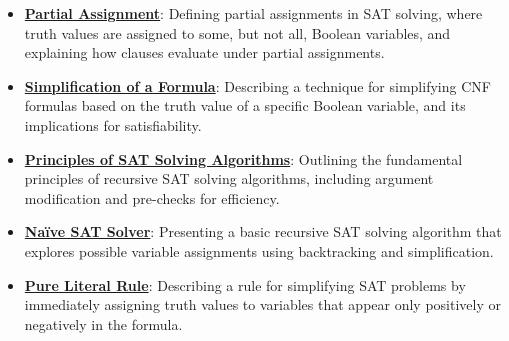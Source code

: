 \documentclass{article}%
\begin{document}
\begin{itemize}[leftmargin=*]
\item \href{https://purdue.brightspace.com/d2l/common/assets/pdfjs-d2l-dist/1.0.14-legacy/web/viewer.html?file=\%2Fcontent\%2Fenforced\%2F1095467-wl.202510.CS.24300.001\%2F15L2-SAT.pdf\%3Fou\%3D1095467\&lang=en-us\&container=d2l-fileviewer-rendered-pdf\&fullscreen=d2l-fileviewer-rendered-pdf-dialog\&height=667#page=14}{\textbf{Partial Assignment}}: Defining partial assignments in SAT solving, where truth values are assigned to some, but not all, Boolean variables, and explaining how clauses evaluate under partial assignments.%
\item \href{https://purdue.brightspace.com/d2l/common/assets/pdfjs-d2l-dist/1.0.14-legacy/web/viewer.html?file=\%2Fcontent\%2Fenforced\%2F1095467-wl.202510.CS.24300.001\%2F15L2-SAT.pdf\%3Fou\%3D1095467\&lang=en-us\&container=d2l-fileviewer-rendered-pdf\&fullscreen=d2l-fileviewer-rendered-pdf-dialog\&height=667#page=15}{\textbf{Simplification of a Formula}}: Describing a technique for simplifying CNF formulas based on the truth value of a specific Boolean variable, and its implications for satisfiability.%
\item \href{https://purdue.brightspace.com/d2l/common/assets/pdfjs-d2l-dist/1.0.14-legacy/web/viewer.html?file=\%2Fcontent\%2Fenforced\%2F1095467-wl.202510.CS.24300.001\%2F15L2-SAT.pdf\%3Fou\%3D1095467\&lang=en-us\&container=d2l-fileviewer-rendered-pdf\&fullscreen=d2l-fileviewer-rendered-pdf-dialog\&height=667#page=17}{\textbf{Principles of SAT Solving Algorithms}}: Outlining the fundamental principles of recursive SAT solving algorithms, including argument modification and pre-checks for efficiency.%
\item \href{https://purdue.brightspace.com/d2l/common/assets/pdfjs-d2l-dist/1.0.14-legacy/web/viewer.html?file=\%2Fcontent\%2Fenforced\%2F1095467-wl.202510.CS.24300.001\%2F15L2-SAT.pdf\%3Fou\%3D1095467\&lang=en-us\&container=d2l-fileviewer-rendered-pdf\&fullscreen=d2l-fileviewer-rendered-pdf-dialog\&height=667#page=18}{\textbf{Naïve SAT Solver}}: Presenting a basic recursive SAT solving algorithm that explores possible variable assignments using backtracking and simplification.%
\item \href{https://purdue.brightspace.com/d2l/common/assets/pdfjs-d2l-dist/1.0.14-legacy/web/viewer.html?file=\%2Fcontent\%2Fenforced\%2F1095467-wl.202510.CS.24300.001\%2F15L2-SAT.pdf\%3Fou\%3D1095467\&lang=en-us\&container=d2l-fileviewer-rendered-pdf\&fullscreen=d2l-fileviewer-rendered-pdf-dialog\&height=667#page=19}{\textbf{Pure Literal Rule}}: Describing a rule for simplifying SAT problems by immediately assigning truth values to variables that appear only positively or negatively in the formula.%

\end{itemize}
\end{document}
